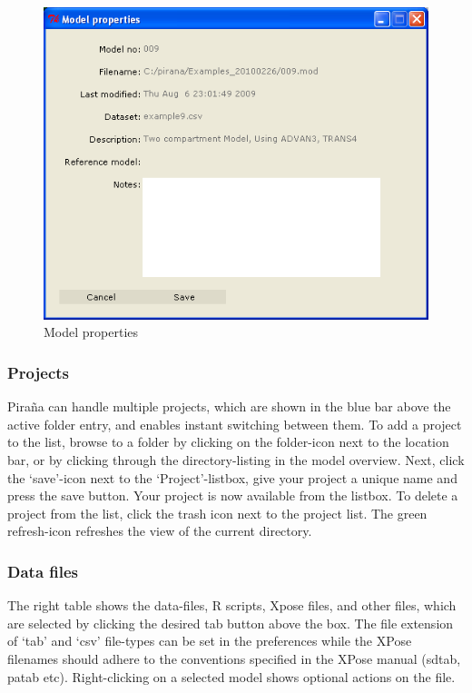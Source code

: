 \documentclass[a4,11pt]{report} \usepackage[pdftex]{graphicx}
\begin{document}
\begin{figure}[hbt] \centering
    \includegraphics[scale=0.4]{images/model_properties.png}
    \caption{Model properties}
\end{figure}

\subsubsection*{Projects} Pira\~na can handle multiple projects, which are shown in the blue bar above the active folder entry, and
enables instant switching between them. To add a project to the list,
browse to a folder by clicking on the folder-icon next to the location
bar, or by clicking through the directory-listing in the model
overview. Next, click the `save'-icon next to the
`Project'-listbox, give your project a unique name and press the save
button. Your project is now available from the listbox. To delete
a project from the list, click the trash icon next to the project
list. The green refresh-icon refreshes the view of the current directory.

\subsubsection*{Data files} The right table shows the data-files, R
scripts, Xpose files, and other files, which are selected by clicking
the desired tab button above the box. The file extension of `tab' and
`csv' file-types can be set in the preferences while the XPose
filenames should adhere to the conventions specified in the XPose
manual (sdtab, patab etc). Right-clicking on a selected model shows
optional actions on the file.
\end{document}
